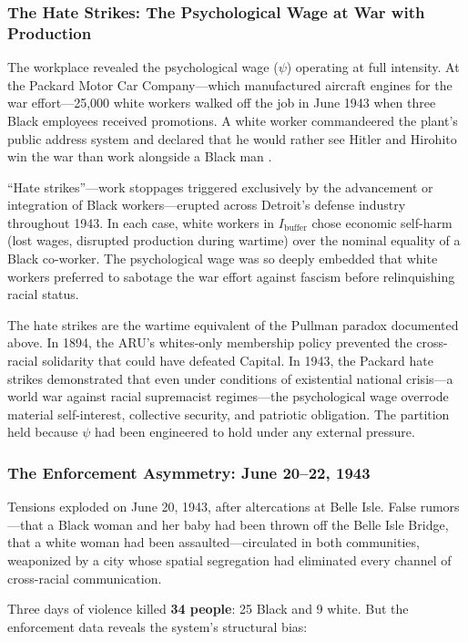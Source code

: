 \subsubsection{The Hate Strikes: The Psychological Wage at War with Production}

The workplace revealed the psychological wage ($\psi$) operating at full intensity. At the Packard Motor Car Company---which manufactured aircraft engines for the war effort---25,000 white workers walked off the job in June 1943 when three Black employees received promotions. A white worker commandeered the plant's public address system and declared that he would rather see Hitler and Hirohito win the war than work alongside a Black man \cite{capeci_detroit}.

``Hate strikes''---work stoppages triggered exclusively by the advancement or integration of Black workers---erupted across Detroit's defense industry throughout 1943. In each case, white workers in $I_{\text{buffer}}$ chose economic self-harm (lost wages, disrupted production during wartime) over the nominal equality of a Black co-worker. The psychological wage was so deeply embedded that white workers preferred to sabotage the war effort against fascism before relinquishing racial status.

The hate strikes are the wartime equivalent of the Pullman paradox documented above. In 1894, the ARU's whites-only membership policy prevented the cross-racial solidarity that could have defeated Capital. In 1943, the Packard hate strikes demonstrated that even under conditions of existential national crisis---a world war against racial supremacist regimes---the psychological wage overrode material self-interest, collective security, and patriotic obligation. The partition held because $\psi$ had been engineered to hold under any external pressure.

\subsubsection{The Enforcement Asymmetry: June 20--22, 1943}

Tensions exploded on June 20, 1943, after altercations at Belle Isle. False rumors---that a Black woman and her baby had been thrown off the Belle Isle Bridge, that a white woman had been assaulted---circulated in both communities, weaponized by a city whose spatial segregation had eliminated every channel of cross-racial communication.

Three days of violence killed \textbf{34 people}: 25 Black and 9 white. But the enforcement data reveals the system's structural bias:

